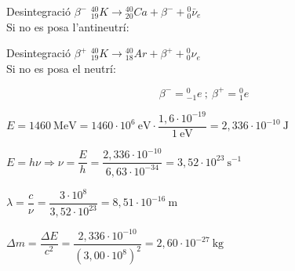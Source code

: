 \begin{solapartat}
 Desintegració $\beta^-$ \quad ${}^{40}_{19}K \to {}^{40}_{20}Ca + \beta^- + {}^{0}_{0}\bar{\nu}_e$\\
Si no es posa l'antineutrí: 

 Desintegració $\beta^+$ \quad ${}^{40}_{19}K \to {}^{40}_{18}Ar + \beta^+ + {}^{0}_{0}\nu_e$\\
Si no es posa el neutrí: 

\[ \beta^- = {}^{0}_{-1}e\ ;\ \beta^+ = {}^{0}_{1}e \]
\end{solapartat}

\begin{solapartat}
 $E = 1460\ \mathrm{MeV} = 1460\cdot 10^{6}\ \mathrm{eV}\cdot\dfrac{1,6\cdot 10^{-19}}{1\ \mathrm{eV}} = 2,336\cdot 10^{-10}\ \mathrm{J}$

 $E = h\nu \Rightarrow \nu = \dfrac{E}{h} = \dfrac{2,336\cdot 10^{-10}}{6,63\cdot 10^{-34}} = 3,52\cdot 10^{23}\ \mathrm{s^{-1}}$

 $\lambda = \dfrac{c}{\nu} = \dfrac{3\cdot 10^{8}}{3,52\cdot 10^{23}} = 8,51\cdot 10^{-16}\ \mathrm{m}$

 $\Delta m = \dfrac{\Delta E}{c^2} = \dfrac{2,336\cdot 10^{-10}}{(3,00\cdot 10^{8})^2} = 2,60\cdot 10^{-27}\ \mathrm{kg}$
\end{solapartat}
